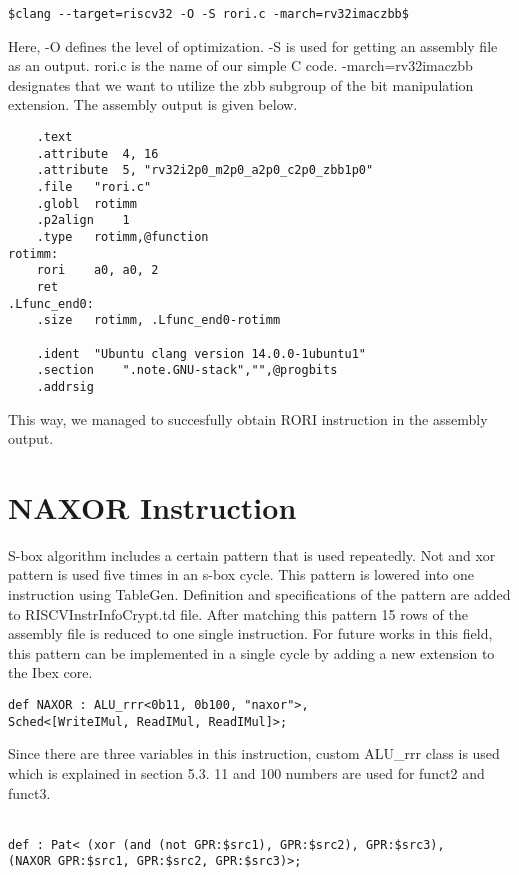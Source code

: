 \begin{lstlisting}
$clang --target=riscv32 -O -S rori.c -march=rv32imaczbb$
\end{lstlisting}

Here, -O defines the level of optimization. -S is used for getting an assembly file as an output. rori.c is the name of our simple C code. -march=rv32imaczbb designates that we want to utilize the zbb subgroup of the bit manipulation extension. The assembly output is given below.%

\begin{lstlisting}
	.text
	.attribute	4, 16
	.attribute	5, "rv32i2p0_m2p0_a2p0_c2p0_zbb1p0"
	.file	"rori.c"
	.globl	rotimm
	.p2align	1
	.type	rotimm,@function
rotimm:
	rori	a0, a0, 2
	ret
.Lfunc_end0:
	.size	rotimm, .Lfunc_end0-rotimm

	.ident	"Ubuntu clang version 14.0.0-1ubuntu1"
	.section	".note.GNU-stack","",@progbits
	.addrsig
\end{lstlisting}

This way, we managed to succesfully obtain RORI instruction in the assembly output.

\section{NAXOR Instruction}

S-box algorithm includes a certain pattern that is used repeatedly. Not and xor pattern is used five times in an s-box cycle. This pattern is lowered into one instruction using TableGen. Definition and specifications of the pattern are added to RISCVInstrInfoCrypt.td file. After matching this pattern 15 rows of the assembly file is reduced to one single instruction. For future works in this field, this pattern can be implemented in a single cycle by adding a new extension to the Ibex core.  

\begin{lstlisting}
def NAXOR : ALU_rrr<0b11, 0b100, "naxor">,
Sched<[WriteIMul, ReadIMul, ReadIMul]>;
\end{lstlisting}

Since there are three variables in this instruction, custom ALU\_rrr class is used which is explained in section 5.3. 11 and 100 numbers are used for funct2 and funct3.
\\\\
\begin{lstlisting}
def : Pat< (xor (and (not GPR:$src1), GPR:$src2), GPR:$src3),
(NAXOR GPR:$src1, GPR:$src2, GPR:$src3)>;
\end{lstlisting}

